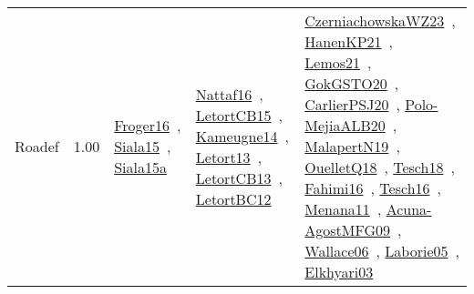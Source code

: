 {\begin{longtable}{p{3cm}r>{\raggedright\arraybackslash}p{6cm}>{\raggedright\arraybackslash}p{6cm}>{\raggedright\arraybackslash}p{8cm}}
\index{Roadef}\index{Benchmarks!Roadef}Roadef &  1.00 & \href{../works/Froger16.pdf}{Froger16}~\cite{Froger16}, \href{../works/Siala15.pdf}{Siala15}~\cite{Siala15}, \href{../works/Siala15a.pdf}{Siala15a}~\cite{Siala15a} & \href{../works/Nattaf16.pdf}{Nattaf16}~\cite{Nattaf16}, \href{../works/LetortCB15.pdf}{LetortCB15}~\cite{LetortCB15}, \href{../works/Kameugne14.pdf}{Kameugne14}~\cite{Kameugne14}, \href{../works/Letort13.pdf}{Letort13}~\cite{Letort13}, \href{../works/LetortCB13.pdf}{LetortCB13}~\cite{LetortCB13}, \href{../works/LetortBC12.pdf}{LetortBC12}~\cite{LetortBC12} & \href{../works/CzerniachowskaWZ23.pdf}{CzerniachowskaWZ23}~\cite{CzerniachowskaWZ23}, \href{../works/HanenKP21.pdf}{HanenKP21}~\cite{HanenKP21}, \href{../works/Lemos21.pdf}{Lemos21}~\cite{Lemos21}, \href{../works/GokGSTO20.pdf}{GokGSTO20}~\cite{GokGSTO20}, \href{../works/CarlierPSJ20.pdf}{CarlierPSJ20}~\cite{CarlierPSJ20}, \href{../works/Polo-MejiaALB20.pdf}{Polo-MejiaALB20}~\cite{Polo-MejiaALB20}, \href{../works/MalapertN19.pdf}{MalapertN19}~\cite{MalapertN19}, \href{../works/OuelletQ18.pdf}{OuelletQ18}~\cite{OuelletQ18}, \href{../works/Tesch18.pdf}{Tesch18}~\cite{Tesch18}, \href{../works/Fahimi16.pdf}{Fahimi16}~\cite{Fahimi16}, \href{../works/Tesch16.pdf}{Tesch16}~\cite{Tesch16}, \href{../works/Menana11.pdf}{Menana11}~\cite{Menana11}, \href{../works/Acuna-AgostMFG09.pdf}{Acuna-AgostMFG09}~\cite{Acuna-AgostMFG09}, \href{../works/Wallace06.pdf}{Wallace06}~\cite{Wallace06}, \href{../works/Laborie05.pdf}{Laborie05}~\cite{Laborie05}, \href{../works/Elkhyari03.pdf}{Elkhyari03}~\cite{Elkhyari03}\\

\end{longtable}}
